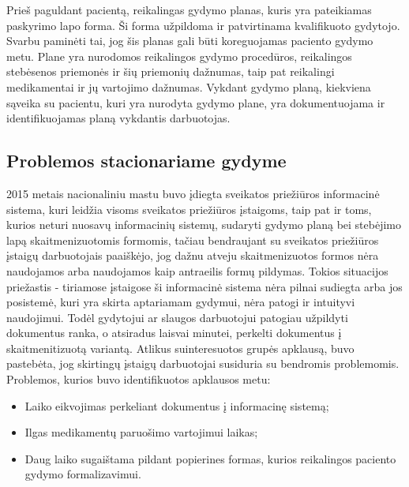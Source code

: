 Prieš paguldant pacientą, reikalingas gydymo planas, kuris yra pateikiamas paskyrimo lapo forma. Ši forma užpildoma ir patvirtinama kvalifikuoto gydytojo. Svarbu paminėti tai, jog šis planas gali būti koreguojamas paciento gydymo metu. Plane yra nurodomos reikalingos gydymo procedūros, reikalingos stebėsenos priemonės ir šių priemonių dažnumas, taip pat reikalingi medikamentai ir jų vartojimo dažnumas. Vykdant gydymo planą, kiekviena sąveika su pacientu, kuri yra nurodyta gydymo plane, yra dokumentuojama ir identifikuojamas planą vykdantis darbuotojas.
\subsection{Problemos stacionariame gydyme}
2015 metais nacionaliniu mastu buvo įdiegta sveikatos priežiūros informacinė sistema, kuri leidžia visoms sveikatos priežiūros įstaigoms, taip pat ir toms, kurios neturi nuosavų informacinių sistemų, sudaryti gydymo planą bei stebėjimo lapą skaitmenizuotomis formomis, tačiau bendraujant su sveikatos priežiūros įstaigų darbuotojais paaiškėjo, jog dažnu atveju skaitmenizuotos formos nėra naudojamos arba naudojamos kaip antraeilis formų pildymas. Tokios situacijos priežastis - tiriamose įstaigose ši informacinė sistema nėra pilnai sudiegta arba jos posistemė, kuri yra skirta aptariamam gydymui, nėra patogi ir intuityvi naudojimui. Todėl gydytojui ar slaugos darbuotojui patogiau užpildyti dokumentus ranka, o atsiradus laisvai minutei, perkelti dokumentus į skaitmenitizuotą variantą. Atlikus suinteresuotos grupės apklausą, buvo pastebėta, jog skirtingų įstaigų darbuotojai susiduria su bendromis problemomis. Problemos, kurios buvo identifikuotos apklausos metu: 
\begin{itemize}
    \item Laiko eikvojimas perkeliant dokumentus į informacinę sistemą;
    \item Ilgas medikamentų paruošimo vartojimui laikas;
    \item Daug laiko sugaištama pildant popierines formas, kurios reikalingos paciento gydymo formalizavimui.
\end{itemize}

